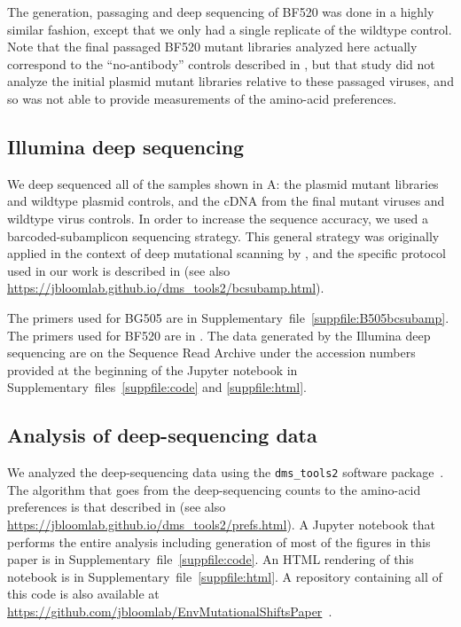 \documentclass[9pt]{elife}
\begin{document}
The generation, passaging and deep sequencing of BF520 was done in a highly similar fashion, except that we only had a single replicate of the wildtype control.
Note that the final passaged BF520 mutant libraries analyzed here actually correspond to the ``no-antibody'' controls described in \citet{dingens2017comprehensive}, but that study did not analyze the initial plasmid mutant libraries relative to these passaged viruses, and so was not able to provide measurements of the amino-acid preferences.

\subsection{Illumina deep sequencing}
We deep sequenced all of the samples shown in A: the plasmid mutant libraries and wildtype plasmid controls, and the cDNA from the final mutant viruses and wildtype virus controls.
In order to increase the sequence accuracy, we used a barcoded-subamplicon sequencing strategy.
This general strategy was originally applied in the context of deep mutational scanning by \citet{wu2014high}, and the specific protocol used in our work is described in \citet{doud2016accurate} (see also \url{https://jbloomlab.github.io/dms_tools2/bcsubamp.html}).

The primers used for BG505 are in Supplementary~file~\ref{suppfile:B505bcsubamp}.
The primers used for BF520 are in \citet{dingens2017comprehensive}.
The data generated by the Illumina deep sequencing are on the Sequence Read Archive under the accession numbers provided at the beginning of the Jupyter notebook in Supplementary~files~\ref{suppfile:code} and \ref{suppfile:html}.

\subsection{Analysis of deep-sequencing data}
We analyzed the deep-sequencing data using the \texttt{dms\_tools2} software package~\citep[\url{https://jbloomlab.github.io/dms_tools2/}, version 2.2.4]{bloom2015software}.
The algorithm that goes from the deep-sequencing counts to the amino-acid preferences is that described in \citet{bloom2015software} (see also \url{https://jbloomlab.github.io/dms_tools2/prefs.html}).
A Jupyter notebook that performs the entire analysis including generation of most of the figures in this paper is in Supplementary~file~\ref{suppfile:code}.
An HTML rendering of this notebook is in Supplementary~file~\ref{suppfile:html}.
A repository containing all of this code is also available at \url{https://github.com/jbloomlab/EnvMutationalShiftsPaper}~\citep[][copy archived at \url{https://github.com/elifesciences-publications/EnvMutationalShiftsPaper}]{haddox2018github}.
\end{document}
